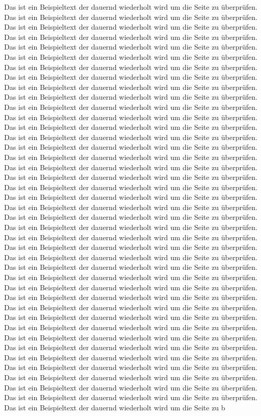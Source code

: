 Das ist ein Beispieltext der dauernd wiederholt wird um die Seite zu überprüfen. Das ist ein Beispieltext der dauernd wiederholt wird um die Seite zu überprüfen. Das ist ein Beispieltext der dauernd wiederholt wird um die Seite zu überprüfen. Das ist ein Beispieltext der dauernd wiederholt wird um die Seite zu überprüfen. Das ist ein Beispieltext der dauernd wiederholt wird um die Seite zu überprüfen. Das ist ein Beispieltext der dauernd wiederholt wird um die Seite zu überprüfen. Das ist ein Beispieltext der dauernd wiederholt wird um die Seite zu überprüfen. Das ist ein Beispieltext der dauernd wiederholt wird um die Seite zu überprüfen. Das ist ein Beispieltext der dauernd wiederholt wird um die Seite zu überprüfen. Das ist ein Beispieltext der dauernd wiederholt wird um die Seite zu überprüfen. Das ist ein Beispieltext der dauernd wiederholt wird um die Seite zu überprüfen. Das ist ein Beispieltext der dauernd wiederholt wird um die Seite zu überprüfen. Das ist ein Beispieltext der dauernd wiederholt wird um die Seite zu überprüfen. Das ist ein Beispieltext der dauernd wiederholt wird um die Seite zu überprüfen. Das ist ein Beispieltext der dauernd wiederholt wird um die Seite zu überprüfen. Das ist ein Beispieltext der dauernd wiederholt wird um die Seite zu überprüfen. Das ist ein Beispieltext der dauernd wiederholt wird um die Seite zu überprüfen. Das ist ein Beispieltext der dauernd wiederholt wird um die Seite zu überprüfen. Das ist ein Beispieltext der dauernd wiederholt wird um die Seite zu überprüfen. Das ist ein Beispieltext der dauernd wiederholt wird um die Seite zu überprüfen. Das ist ein Beispieltext der dauernd wiederholt wird um die Seite zu überprüfen. Das ist ein Beispieltext der dauernd wiederholt wird um die Seite zu überprüfen. Das ist ein Beispieltext der dauernd wiederholt wird um die Seite zu überprüfen. Das ist ein Beispieltext der dauernd wiederholt wird um die Seite zu überprüfen. Das ist ein Beispieltext der dauernd wiederholt wird um die Seite zu überprüfen. Das ist ein Beispieltext der dauernd wiederholt wird um die Seite zu überprüfen. Das ist ein Beispieltext der dauernd wiederholt wird um die Seite zu überprüfen. Das ist ein Beispieltext der dauernd wiederholt wird um die Seite zu überprüfen. Das ist ein Beispieltext der dauernd wiederholt wird um die Seite zu überprüfen. Das ist ein Beispieltext der dauernd wiederholt wird um die Seite zu überprüfen. Das ist ein Beispieltext der dauernd wiederholt wird um die Seite zu überprüfen. Das ist ein Beispieltext der dauernd wiederholt wird um die Seite zu überprüfen. Das ist ein Beispieltext der dauernd wiederholt wird um die Seite zu überprüfen. Das ist ein Beispieltext der dauernd wiederholt wird um die Seite zu überprüfen. Das ist ein Beispieltext der dauernd wiederholt wird um die Seite zu überprüfen. Das ist ein Beispieltext der dauernd wiederholt wird um die Seite zu überprüfen. Das ist ein Beispieltext der dauernd wiederholt wird um die Seite zu überprüfen. Das ist ein Beispieltext der dauernd wiederholt wird um die Seite zu überprüfen. Das ist ein Beispieltext der dauernd wiederholt wird um die Seite zu überprüfen. Das ist ein Beispieltext der dauernd wiederholt wird um die Seite zu überprüfen. Das ist ein Beispieltext der dauernd wiederholt wird um die Seite zu b